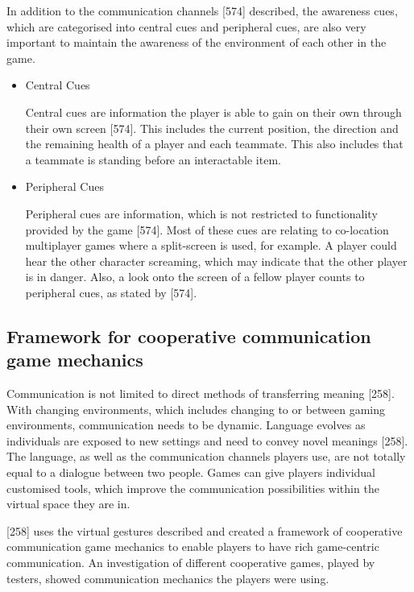 In addition to the communication channels \textcite{Cheung2012CommunicationGaming}[574] described, the awareness cues, which are categorised into central cues and peripheral cues, are also very important to maintain the awareness of the environment of each other in the game. 
\begin{itemize}
    \item Central Cues 
    
    Central cues are information the player is able to gain on their own through their own screen \autocite{Cheung2012CommunicationGaming}[574]. This includes the current position, the direction and the remaining health of a player and each teammate. This also includes that a teammate is standing before an interactable item.
    \item Peripheral Cues
    
    Peripheral cues are information, which is not restricted to functionality provided by the game \autocite{Cheung2012CommunicationGaming}[574]. Most of these cues are relating to co-location multiplayer games where a split-screen is used, for example. A player could hear the other character screaming, which may indicate that the other player is in danger. Also, a look onto the screen of a fellow player counts to peripheral cues, as stated by \textcite{Cheung2012CommunicationGaming}[574].
\end{itemize}



\subsection{Framework for cooperative communication game mechanics}
\label{section:Framework for cooperative communication game mechanics}

Communication is not limited to direct methods of transferring meaning \textcite{Toups2014ATheory}[258]. With changing environments, which includes
changing to or between gaming environments, communication needs to be dynamic. Language evolves as individuals are exposed to new settings and need to convey novel meanings \textcite{Toups2014ATheory}[258].
The language, as well as the communication channels players use, are not totally equal to a dialogue between two people. Games can give players individual customised tools, which improve the communication possibilities within the virtual space they are in. 

\textcite{Toups2014ATheory}[258] uses the virtual gestures \textcite{Cheung2012CommunicationGaming} described and created a framework of cooperative communication game mechanics to enable players to have rich game-centric communication.  
An investigation of different cooperative games, played by testers, showed communication mechanics the players were using. 

